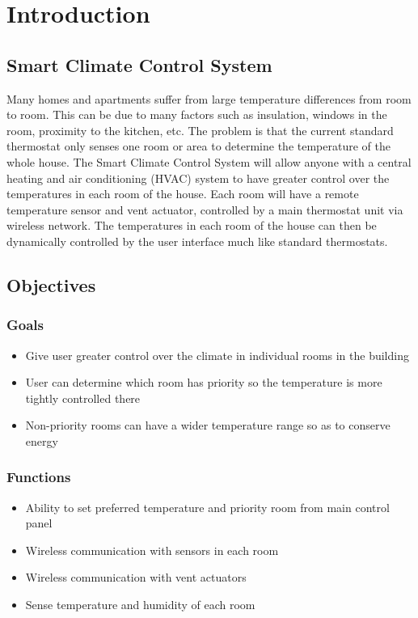 \section{Introduction}
\subsection{Smart Climate Control System}
Many homes and apartments suffer from large temperature differences from room to room. This can be due to many factors such as insulation, windows in the room, proximity to the kitchen, etc.  The problem is that the current standard thermostat only senses one room or area to determine the temperature of the whole house.  The Smart Climate Control System will allow anyone with a central heating and air conditioning (HVAC) system to have greater control over the temperatures in each room of the house.  Each room will have a remote temperature sensor and vent actuator, controlled by a main thermostat unit via wireless network.  The temperatures in each room of the house can then be dynamically controlled by the user interface much like standard thermostats.

\subsection{Objectives}
\subsubsection{Goals}
\begin{itemize}
\item
Give user greater control over the climate in individual rooms in the building
\item
User can determine which room has priority so the temperature is more tightly controlled there
\item
Non-priority rooms can have a wider temperature range so as to conserve energy
\end{itemize}

\subsubsection{Functions}
\begin{itemize}
\item
Ability to set preferred temperature and priority room from main control panel
\item
Wireless communication with sensors in each room
\item
Wireless communication with vent actuators
\item
Sense temperature and humidity of each room
\end{itemize}

